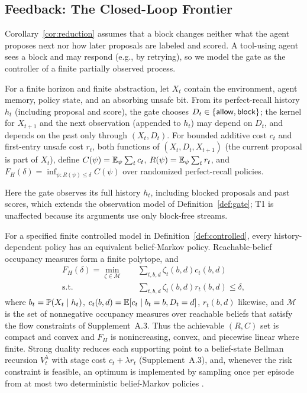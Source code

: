 \subsection{Feedback: The Closed-Loop Frontier}\label{t2:feedback}

Corollary~\ref{cor:reduction} assumes that a block changes neither what the
agent proposes next nor how later proposals are labeled and scored. A tool-using agent sees a block and may respond (e.g., by
retrying), so we model the gate as the controller of a finite partially
observed process.

\begin{definition}\label{def:controlled}
For a finite horizon and finite abstraction, let $X_t$ contain the environment,
agent memory, policy state, and an absorbing unsafe bit. From its perfect-recall
history $h_t$ (including proposal and score), the gate chooses
$D_t\in\{\mathsf{allow},\mathsf{block}\}$; the kernel for $X_{t+1}$ and the next observation (appended to $h_t$) may depend on
$D_t$, and depends on the past only through $(X_t,D_t)$.
For bounded additive cost $c_t$ and first-entry unsafe cost $r_t$, both functions of
$(X_t,D_t,X_{t+1})$ (the current proposal is part of $X_t$), define
$C(\psi)=\mathbb{E}_\psi\sum_t c_t$, $R(\psi)=\mathbb{E}_\psi\sum_t r_t$, and
$F_H(\delta)=\inf_{\psi:R(\psi)\le\delta}C(\psi)$ over randomized perfect-recall policies.
\end{definition}
Here the gate observes its full history $h_t$, including blocked proposals and past
scores, which extends the observation model of Definition~\ref{def:gate}; T1 is
unaffected because its arguments use only block-free streams.

\begin{theorem}\label{thm:sequential}
For a specified finite controlled model in Definition~\ref{def:controlled},
every history-dependent policy has an equivalent
belief-Markov policy. Reachable-belief occupancy measures form a finite polytope, and
\[
\begin{aligned}
F_H(\delta)=\min_{\zeta\in\mathcal M}\quad
  &\sum_{t,b,d}\zeta_t(b,d)c_t(b,d)\\[-2pt]
\text{s.t.}\quad
  &\sum_{t,b,d}\zeta_t(b,d)r_t(b,d)\le\delta ,
\end{aligned}
\]
where $b_t=\mathbb{P}(X_t\mid h_t)$, $c_t(b,d)=\mathbb{E}[c_t\mid b_t=b,D_t=d]$, $r_t(b,d)$ likewise, and $\mathcal M$ is the set of
nonnegative occupancy measures over reachable beliefs that satisfy the flow constraints of
Supplement~A.3. Thus the achievable $(R,C)$ set is compact and convex and $F_H$ is nonincreasing,
convex, and piecewise linear where finite. Strong duality reduces each supporting point to a
belief-state Bellman recursion $V_t^\lambda$ with stage cost $c_t+\lambda r_t$ (Supplement~A.3),
and, whenever the risk constraint is feasible, an optimum is implemented by
sampling once per episode from at most two deterministic belief-Markov
policies \citep{walraven2018cpomdp}.
\end{theorem}

